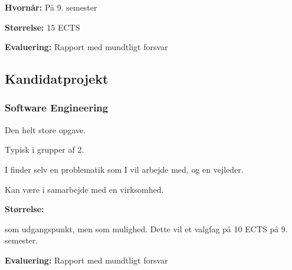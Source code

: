 {\begin{frame}[fragile]
  \vspace{5mm}
  \textbf{Hvornår:} På 9. semester
  
  \pause
  \vspace{5mm}
  \textbf{Størrelse:} 15 ECTS
  
  \pause
  \vspace{5mm}
  \textbf{Evaluering:} Rapport med mundtligt forsvar
\end{frame}

\subsection{Kandidatprojekt}
\begin{frame}[fragile]
  \frametitle{Software Engineering }
  \pause
  \vspace{3mm}
  Den helt store opgave.
  
  \pause
  \vspace{5mm}
  Typisk i grupper af 2.
  
  \vspace{5mm}
  I finder selv en problematik som I vil arbejde med, og en vejleder.
  
  \vspace{5mm}
  Kan være i samarbejde med en virksomhed.
  
  \pause
  \vspace{5mm}
  \textbf{Størrelse:}
  \begin{itemize}
     som udgangspunkt\pause, men
     som mulighed. Dette vil  et valgfag på 10 ECTS på 9. semester.
  \end{itemize}
  
  \pause
  \vspace{5mm}
  \textbf{Evaluering:} Rapport med mundtligt forsvar
\end{frame}

}


